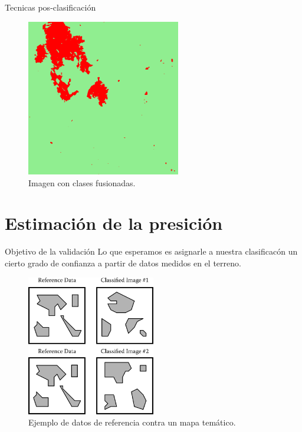\documentclass[]{beamer}
\begin{document}
\begin{frame}{Tecnicas pos-clasificación}
  \begin{figure}
    \includegraphics[width=0.6\textwidth]{imagenes/im_filter.png}
    \caption{Imagen con clases fusionadas.}
  \end{figure}
\end{frame}

\section{Estimación de la presición}
\begin{frame}{\subsecname}
\begin{block}{Objetivo de la validación}
  Lo que esperamos es asignarle a nuestra clasificacón un cierto grado de confianza a partir de datos medidos en el terreno.
\end{block}
\end{frame}

\begin{frame}{\subsecname}
  \begin{figure}
  \includegraphics[width=0.5\textwidth]{imagenes/valid.png}
  \caption{Ejemplo de datos de referencia contra un mapa temático.}
  \end{figure}
\end{frame}
\end{document}
